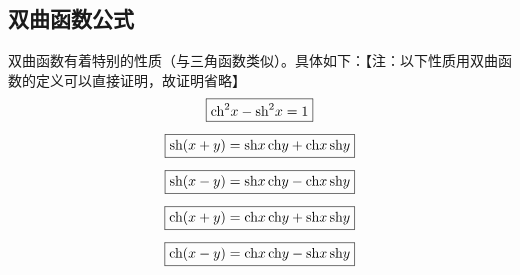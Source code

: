 \subsection{双曲函数公式}
双曲函数有着特别的性质（与三角函数类似）。具体如下：【注：以下性质用双曲函数的定义可以直接证明，故证明省略】
\begin{align}
	\boxed{\text{ch}^2 x - \text{sh}^2 x = 1} \qquad \quad\\[0.5em]
	\boxed{\text{sh} (x + y) = \text{sh} x \,\text{ch} y + \text{ch} x \,\text{sh} y} \\[0.5em]
	\boxed{\text{sh} (x - y) = \text{sh} x \,\text{ch} y - \text{ch} x \,\text{sh} y} \\[0.5em]
	\boxed{\text{ch} (x + y) = \text{ch} x \,\text{ch} y + \text{sh} x \,\text{sh} y} \\[0.5em]
	\boxed{\text{ch} (x - y) = \text{ch} x \,\text{ch} y - \text{sh} x \,\text{sh} y}  
\end{align}
















